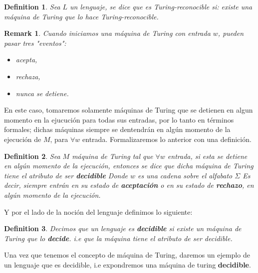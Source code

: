 \documentclass[10pt]{report}
\newtheorem*{remark}{Remark}
\newtheorem{definition}{Definition}
\begin{document}
    \begin{definition}
        Sea $L$ un lenguaje, se dice que es Turing-reconocible si:
        existe una máquina de Turing que lo hace Turing-reconocible.
    \end{definition}

    \begin{remark}
        Cuando iniciamos una máquina de Turing con entrada $w$, pueden pasar tres "eventos":
        \begin{itemize}
            \item acepta,
            \item rechaza,
            \item nunca se detiene.
        \end{itemize}
    \end{remark}
    En este caso, tomaremos solamente máquinas de Turing que se detienen en algun momento en la ejucución para todas sus entradas,
    por lo tanto en términos formales; dichas máquinas siempre se dentendrán en algún momento de la
    ejecución de $M$, para $\forall w$ entrada.
    Formalizaremos lo anterior con una definición.
    \begin{definition}
        Sea $M$ máquina de Turing tal que $\forall w$ entrada, si esta se detiene en algún momento de la ejecución,
        entonces se dice que dicha máquina de Turing tiene el atributo de ser
        \textbf{decidible}\newline
        Donde $w$ es una cadena sobre el alfabato $\Sigma$
        Es decir, siempre entrán en su estado de \textbf{aceptación}
        o en su estado de \textbf{rechazo}, en algún momento de la ejecución.
    \end{definition}
    Y por el lado de la noción del lenguaje definimos lo siguiente:
    \begin{definition}
        Decimos que un lenguaje es \textbf{decidible} si existe un máquina de Turing
        que lo \textbf{decide}.
        i.e que la máquina tiene el atributo de ser decidible.
    \end{definition}
    Una vez que tenemos el concepto de máquina de Turing, daremos un ejemplo de un lenguaje que es decidible,
    i.e expondremos una máquina de turing \textbf{decidible}.
\end{document}
